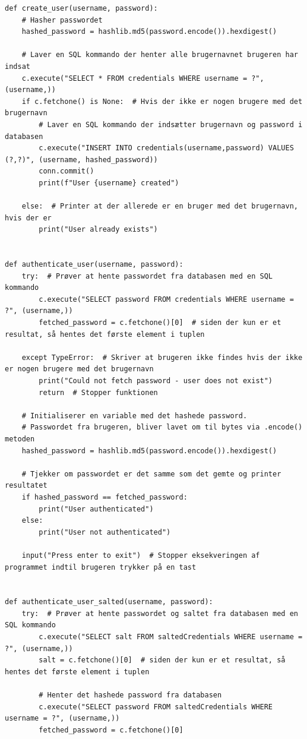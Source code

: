 \documentclass[12pt]{article}
\begin{document}
\begin{verbatim}
def create_user(username, password):
    # Hasher passwordet
    hashed_password = hashlib.md5(password.encode()).hexdigest()

    # Laver en SQL kommando der henter alle brugernavnet brugeren har indsat
    c.execute("SELECT * FROM credentials WHERE username = ?", (username,))
    if c.fetchone() is None:  # Hvis der ikke er nogen brugere med det brugernavn
        # Laver en SQL kommando der indsætter brugernavn og password i databasen
        c.execute("INSERT INTO credentials(username,password) VALUES (?,?)", (username, hashed_password))
        conn.commit()
        print(f"User {username} created")

    else:  # Printer at der allerede er en bruger med det brugernavn, hvis der er
        print("User already exists")


def authenticate_user(username, password):
    try:  # Prøver at hente passwordet fra databasen med en SQL kommando
        c.execute("SELECT password FROM credentials WHERE username = ?", (username,))
        fetched_password = c.fetchone()[0]  # siden der kun er et resultat, så hentes det første element i tuplen

    except TypeError:  # Skriver at brugeren ikke findes hvis der ikke er nogen brugere med det brugernavn
        print("Could not fetch password - user does not exist")
        return  # Stopper funktionen

    # Initialiserer en variable med det hashede password.
    # Passwordet fra brugeren, bliver lavet om til bytes via .encode() metoden
    hashed_password = hashlib.md5(password.encode()).hexdigest()

    # Tjekker om passwordet er det samme som det gemte og printer resultatet
    if hashed_password == fetched_password:
        print("User authenticated")
    else:
        print("User not authenticated")

    input("Press enter to exit")  # Stopper eksekveringen af programmet indtil brugeren trykker på en tast


def authenticate_user_salted(username, password):
    try:  # Prøver at hente passwordet og saltet fra databasen med en SQL kommando
        c.execute("SELECT salt FROM saltedCredentials WHERE username = ?", (username,))
        salt = c.fetchone()[0]  # siden der kun er et resultat, så hentes det første element i tuplen

        # Henter det hashede password fra databasen
        c.execute("SELECT password FROM saltedCredentials WHERE username = ?", (username,))
        fetched_password = c.fetchone()[0]


\end{verbatim}
\end{document}

